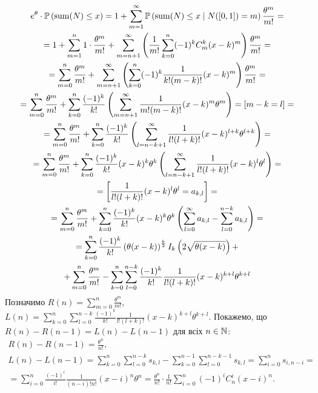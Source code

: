 \begin{gather*}
    e^{\theta} \cdot \mathbb{P}\left(\operatorname{sum}(N) \leq x\right) = 
    1 + \sum_{m=1}^{\infty} \mathbb{P}\left(\operatorname{sum}(N) \leq x \mid N([0, 1]) = m\right) \frac{\theta^m}{m!} = \\ =
    1 + \sum_{m=1}^{n} 1 \cdot \frac{\theta^m}{m!} + 
    \sum_{m=n+1}^{\infty} \left(
        \frac{1}{m!}\sum_{k=0}^{n} (-1)^k C_m^k (x-k)^m
    \right) \frac{\theta^m}{m!} = \\ =
    \sum_{m=0}^{n} \frac{\theta^m}{m!} + 
    \sum_{m=n+1}^{\infty} \left(
        \sum_{k=0}^{n} (-1)^k \frac{1}{k! (m-k)!} (x-k)^m
    \right) \frac{\theta^m}{m!} = \\ =
    \sum_{m=0}^{n} \frac{\theta^m}{m!} + 
    \sum_{k=0}^{n} \frac{(-1)^k}{k!} \left(
        \sum_{m=n+1}^{\infty} \frac{1}{m! (m-k)!} (x - k)^m \theta^m
    \right) = \left[m - k = l \right] = \\
    = \sum_{m=0}^{n} \frac{\theta^m}{m!} + 
    \sum_{k=0}^{n} \frac{(-1)^k}{k!} \left(
        \sum_{l=n-k+1}^{\infty} \frac{1}{l! (l+k)!} (x - k)^{l+k} \theta^{l+k}
    \right) = \\ =
    \sum_{m=0}^{n} \frac{\theta^m}{m!} + 
    \sum_{k=0}^{n} \frac{(-1)^k}{k!} (x-k)^k \theta^k
    \left(
        \sum_{l=n-k+1}^{\infty} \frac{1}{l! (l+k)!} (x - k)^{l} \theta^{l}
    \right) = \\ = \left[\frac{1}{l! (l+k)!} (x - k)^{l} \theta^{l} = a_{k, l}\right] = \\ =
    \sum_{m=0}^{n} \frac{\theta^m}{m!} +
    \sum_{k=0}^{n} \frac{(-1)^k}{k!} (x-k)^k \theta^k
    \left(
        \sum_{l=0}^{\infty} a_{k, l} - 
        \sum_{l=0}^{n-k} a_{k, l} 
    \right) = \\
    = \sum_{k=0}^{n} \frac{(-1)^k}{k!}
    \left(\theta (x - k)\right)^{\frac{k}{2}} I_k\left(2\sqrt{\theta(x-k)}\right) + \\ +
    \sum_{m=0}^{n} \frac{\theta^m}{m!}
    - \sum_{k=0}^{n} \sum_{l=0}^{n-k}  \frac{(-1)^k}{k!} \frac{1}{l! (l+k)!} (x - k)^{k+l} \theta^{k+l}
\end{gather*} 
Позначимо $R(n) = \sum_{m=0}^{n} \frac{\theta^m}{m!}$,
$L(n) = \sum_{k=0}^{n} \sum_{l=0}^{n-k} \frac{(-1)^k}{k!} \frac{1}{l! (l+k)!} (x - k)^{k+l} \theta^{k+l}$.
Покажемо, що $R(n) - R(n-1) = L(n) - L(n-1)$ для всіх $n \in \mathbb{N}$:
\begin{gather*}
    R(n) - R(n-1) = \frac{\theta^n}{n!}, \\
    L(n) - L(n-1) = \sum_{k=0}^n \sum_{l=0}^{n-k} s_{k, l} - 
    \sum_{k=0}^{n-1} \sum_{l=0}^{n-k-1} s_{k, l} = \sum_{i=0}^n s_{i, n-i} = \\ =
    \sum_{i=0}^n \frac{(-1)^i}{i!} \frac{1}{(n-i)! n!} (x - i)^n \theta^n = 
    \frac{\theta^n}{n!} \cdot \frac{1}{n!} \sum_{i=0}^n (-1)^i C_n^i (x-i)^n.
\end{gather*}
